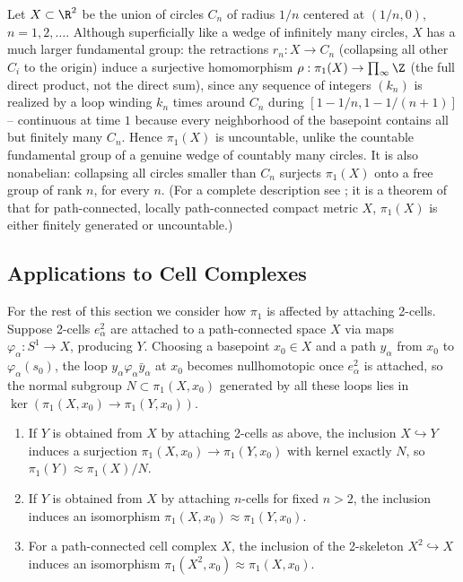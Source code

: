 \begin{example}
\label{ex:shrinking-wedge-circles}
Let $X\subset\R^2$ be the union of circles $C_n$ of radius $1/n$ centered at $(1/n,0)$,
$n=1,2,\ldots$. Although superficially like a wedge of infinitely many circles, $X$ has
a much larger fundamental group: the retractions $r_n:X\to C_n$ (collapsing all
other $C_i$ to the origin) induce a surjective homomorphism
$\rho:\pi_1(X)\to\prod_\infty\Z$ (the full direct product, not the direct sum), since any
sequence of integers $(k_n)$ is realized by a loop winding $k_n$ times around $C_n$
during $[1-1/n,1-1/(n+1)]$ -- continuous at time $1$ because every neighborhood
of the basepoint contains all but finitely many $C_n$. Hence $\pi_1(X)$ is uncountable,
unlike the countable fundamental group of a genuine wedge of countably many
circles. It is also nonabelian: collapsing all circles smaller than $C_n$ surjects
$\pi_1(X)$ onto a free group of rank $n$, for every $n$. (For a complete description see
\cite{CannonConner2000}; it is a theorem of \cite{Shelah1988}
that for path-connected, locally path-connected compact metric $X$, $\pi_1(X)$ is
either finitely generated or uncountable.)


\end{example}

\subsection*{Applications to Cell Complexes}

For the rest of this section we consider how $\pi_1$ is affected by attaching 2-cells.
Suppose 2-cells $e_\alpha^2$ are attached to a path-connected space $X$ via maps
$\varphi_\alpha : S^1 \to X$, producing $Y$. Choosing a basepoint $x_0\in X$ and a path $y_\alpha$
from $x_0$ to $\varphi_\alpha(s_0)$, the loop $y_\alpha\varphi_\alpha\bar y_\alpha$ at $x_0$ becomes nullhomotopic
once $e_\alpha^2$ is attached, so the normal subgroup $N \subset \pi_1(X,x_0)$ generated by all
these loops lies in $\ker(\pi_1(X,x_0)\to\pi_1(Y,x_0))$.

\begin{proposition}
\label{prop:attaching-cells-pi1}
\begin{enumerate}
\item[(a)] If $Y$ is obtained from $X$ by attaching 2-cells as above, the inclusion
$X\hookrightarrow Y$ induces a surjection $\pi_1(X,x_0)\to\pi_1(Y,x_0)$ with kernel exactly $N$,
so $\pi_1(Y) \approx \pi_1(X)/N$.
\item[(b)] If $Y$ is obtained from $X$ by attaching $n$-cells for fixed $n>2$, the
inclusion induces an isomorphism $\pi_1(X,x_0)\approx\pi_1(Y,x_0)$.
\item[(c)] For a path-connected cell complex $X$, the inclusion of the 2-skeleton
$X^2\hookrightarrow X$ induces an isomorphism $\pi_1(X^2,x_0)\approx\pi_1(X,x_0)$.
\end{enumerate}
\end{proposition}

